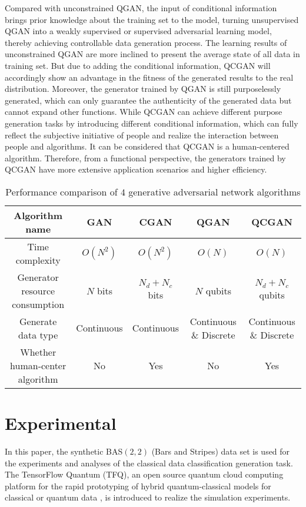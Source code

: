 \documentclass{bmcart}
\begin{document}
Compared with unconstrained QGAN, the input of conditional information brings prior knowledge about the training set to the model, turning unsupervised QGAN into a weakly supervised or supervised adversarial learning model, thereby achieving controllable data generation process. The learning results of unconstrained QGAN are more inclined to present the average state of all data in training set. But due to adding the conditional information, QCGAN will accordingly show an advantage in the fitness of the generated results to the real distribution. Moreover, the generator trained by QGAN is still purposelessly generated, which can only guarantee the authenticity of the generated data but cannot expand other functions. While QCGAN can achieve different purpose generation tasks by introducing different conditional information, which can fully reflect the subjective initiative of people and realize the interaction between people and algorithms. It can be considered that QCGAN is a human-centered algorithm. Therefore, from a functional perspective, the generators trained by QCGAN have more extensive application scenarios and higher efficiency.

\begin{table}[h!]
\caption{Performance comparison of $4$ generative adversarial network algorithms}
\begin{tabular}{ccccc}
\hline
Algorithm name                 & GAN        & CGAN             & QGAN                   & QCGAN                  \\ \hline
Time complexity                & $O({N^2})$ & $O({N^2})$       & $O({N})$               & $O({N})$               \\
Generator resource consumption & $N$ bits   & $N_d + N_c$ bits & $N$ qubits             & $N_d + N_c$ qubits     \\
Generate data type             & Continuous & Continuous       & Continuous \& Discrete & Continuous \& Discrete \\
Whether human-center algorithm & No         & Yes              & No                     & Yes                      \\ \hline
\end{tabular}
\end{table}

\section{Experimental}
In this paper, the synthetic BAS$(2, 2)$ (Bars and Stripes) data set is used for the experiments and analyses of the classical data classification generation task. The TensorFlow Quantum (TFQ), an open source quantum cloud computing platform for the rapid prototyping of hybrid quantum-classical models for classical or quantum data \cite{TFQ}, is introduced to realize the simulation experiments.
\end{document}
